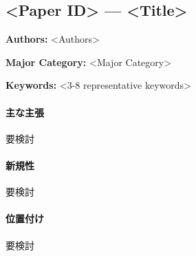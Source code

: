 \subsection{<Paper ID> --- <Title>}
\label{paper:<Paper ID>}
\textbf{Authors:} <Authors>\par
\textbf{Major Category:} <Major Category>\par
\textbf{Keywords:} <3-8 representative keywords>\par
\paragraph{主な主張}
要検討 \cite{BibTeXKey}
\paragraph{新規性}
要検討
\paragraph{位置付け}
要検討
